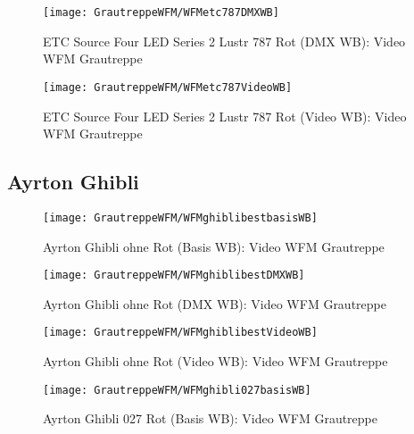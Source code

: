 \documentclass[pagesize,paper=A4,fontsize=12pt,utf8,numbers=noenddot,bibliography=totoc,listof=totoc,DIV=11,BCOR=1mm]{scrreprt}
\begin{document}
\begin{figure}[htp]     %
\centering
\texttt{[image: GrautreppeWFM/WFMetc787DMXWB]} 
\caption {ETC Source Four LED Series 2 Lustr 787 Rot (DMX WB): Video WFM Grautreppe} 
\end{figure}

\begin{figure}[htp]     %
\centering
\texttt{[image: GrautreppeWFM/WFMetc787VideoWB]} 
\caption {ETC Source Four LED Series 2 Lustr 787 Rot (Video WB): Video WFM Grautreppe} 
\end{figure}



\subsection{Ayrton Ghibli}

\begin{figure}[htp]     %
\centering
\texttt{[image: GrautreppeWFM/WFMghiblibestbasisWB]} 
\caption {Ayrton Ghibli ohne Rot (Basis WB): Video WFM Grautreppe} 
\end{figure}

\begin{figure}[htp]     %
\centering
\texttt{[image: GrautreppeWFM/WFMghiblibestDMXWB]} 
\caption {Ayrton Ghibli ohne Rot (DMX WB): Video WFM Grautreppe} 
\end{figure}

\begin{figure}[htp]     %
\centering
\texttt{[image: GrautreppeWFM/WFMghiblibestVideoWB]} 
\caption {Ayrton Ghibli ohne Rot (Video WB): Video WFM Grautreppe} 
\end{figure}



\begin{figure}[htp]     %
\centering
\texttt{[image: GrautreppeWFM/WFMghibli027basisWB]} 
\caption {Ayrton Ghibli 027 Rot (Basis WB): Video WFM Grautreppe} 
\end{figure}
\end{document}
